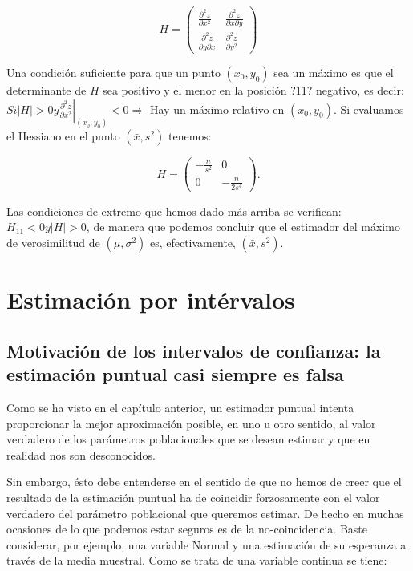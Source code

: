 \documentclass[
]{article}
\begin{document}
\[
H=\left(\begin{array}{cc}
\frac{\partial^{2} z}{\partial x^{2}} & \frac{\partial^{2} z}{\partial x \partial y} \\
\frac{\partial^{2} z}{\partial y \partial x} & \frac{\partial^{2} z}{\partial y^{2}}
\end{array}\right)
\]

Una condición suficiente para que un punto \(\left(x_{0}, y_{0}\right)\) sea un máximo es que el determinante de \(H\) sea positivo y el menor en la posición ?11? negativo, es decir:
\(S i|H|>\left.0 y \frac{\partial^{2} z}{\partial x^{2}}\right|_{\left(x_{0}, y_{0}\right)}<0 \Longrightarrow\) Hay un máximo relativo en \(\left(x_{0}, y_{0}\right)\).
Si evaluamos el Hessiano en el punto \(\left(\bar{x}, s^{2}\right)\) tenemos:

\[
H=\left(\begin{array}{cc}
-\frac{n}{s^{2}} & 0 \\
0 & -\frac{n}{2 s^{4}}
\end{array}\right) .
\]

Las condiciones de extremo que hemos dado más arriba se verifican: \(H_{11}<0 y|H|>0\), de manera que podemos concluir que el estimador del máximo de verosimilitud de \(\left(\mu, \sigma^{2}\right)\) es, efectivamente, \(\left(\bar{x}, s^{2}\right)\).

\section{Estimación por intérvalos}\label{estimaciuxf3n-por-intuxe9rvalos}

\subsection{Motivación de los intervalos de confianza: la estimación puntual casi siempre es falsa}\label{motivaciuxf3n-de-los-intervalos-de-confianza-la-estimaciuxf3n-puntual-casi-siempre-es-falsa}

Como se ha visto en el capítulo anterior, un estimador puntual intenta proporcionar la mejor aproximación posible, en uno u otro sentido, al valor verdadero de los parámetros poblacionales que se desean estimar y que en realidad nos son desconocidos.

Sin embargo, ésto debe entenderse en el sentido de que no hemos de creer que el resultado de la estimación puntual ha de coincidir forzosamente con el valor verdadero del parámetro poblacional que queremos estimar. De hecho en muchas ocasiones de lo que podemos estar seguros es de la no-coincidencia. Baste considerar, por ejemplo, una variable Normal y una estimación de su esperanza a través de la media muestral. Como se trata de una variable continua se tiene:
\end{document}
